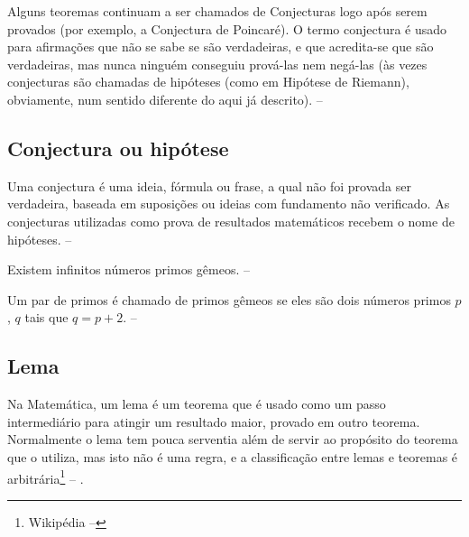Alguns teoremas continuam a ser chamados de Conjecturas logo após serem provados (por exemplo, a Conjectura de Poincaré). O termo conjectura é usado para afirmações que não se sabe se são verdadeiras, e que acredita-se que são verdadeiras, mas nunca ninguém conseguiu prová-las nem negá-las (às vezes conjecturas são chamadas de hipóteses (como em Hipótese de Riemann), obviamente, num sentido diferente do aqui já descrito). -- \showfont


\subsection{Conjectura ou hipótese}

Uma conjectura é uma ideia, fórmula ou frase, a qual não foi provada ser verdadeira, baseada em suposições ou ideias com fundamento não verificado. As conjecturas utilizadas como prova de resultados matemáticos recebem o nome de hipóteses. -- \showfont



\begin{conjectura}
    Existem infinitos números primos gêmeos. -- \showfont
\end{conjectura}

Um par de primos é chamado de primos gêmeos se eles são dois números primos $p$, $q$ tais que $q = p + 2$. -- \showfont



\subsection{Lema}

Na Matemática, um lema é um teorema que é usado como um passo intermediário para atingir um resultado maior, provado em outro teorema. Normalmente o lema tem pouca serventia além de servir ao propósito do teorema que o utiliza, mas isto não é uma regra, e a classificação entre lemas e teoremas é arbitrária\footnote{Wikipédia -- \showfont} -- \showfont.



